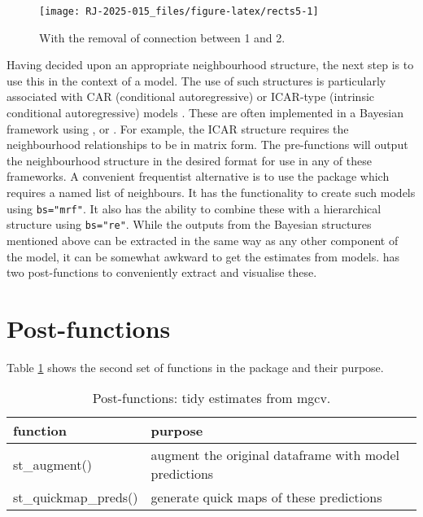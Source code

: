 \begin{figure}

{\centering \texttt{[image: RJ-2025-015\_files/figure-latex/rects5-1]} 

}

\caption{With the removal of connection between 1 and 2. }\label{fig:rects5}
\end{figure}

Having decided upon an appropriate neighbourhood structure, the next step is to use this in the context of a model. The use of such structures is particularly associated with CAR (conditional autoregressive) or ICAR-type (intrinsic conditional autoregressive) models \citep{besag}.
These are often implemented in a Bayesian framework using
,  or . For example, the  ICAR structure requires the neighbourhood relationships to be in matrix form. The pre-functions will output the
neighbourhood structure in the desired format for use in any of these
frameworks. A convenient frequentist alternative is to use the
 package which requires a named list of neighbours. It has the functionality to create such models
using \texttt{bs="mrf"}. It also has the ability to combine these with a
hierarchical structure using \texttt{bs="re"}. While the outputs from the
Bayesian structures mentioned above can be extracted in the same way as
any other component of the model, it can be somewhat awkward to get the
estimates from  models.  has two post-functions to conveniently extract and visualise these.

\section{Post-functions}\label{post-functions}

Table \ref{tab:postfunc-latex} shows the second set of functions in the package and their purpose.

\begin{table}
\centering
\caption{\label{tab:postfunc-latex}Post-functions: tidy estimates from mgcv.}
\centering
\fontsize{9}{11}\selectfont
\begin{tabular}[t]{l|l}
\hline
\textbf{function} & \textbf{purpose}\\
\hline
st\_augment() & augment the original dataframe with model predictions\\
\hline
st\_quickmap\_preds() & generate quick maps of these predictions\\
\hline
\end{tabular}
\end{table}

